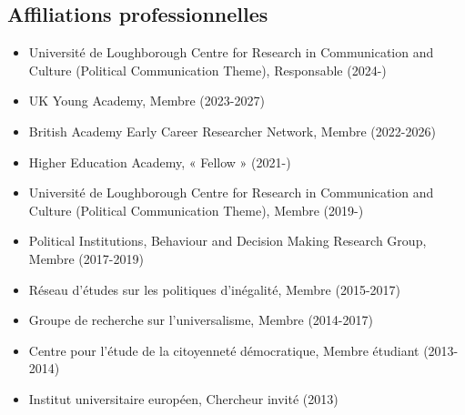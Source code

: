 \documentclass[letterpaper,fontsize=10.5pt]{scrartcl}
\begin{document}
\subsection{Affiliations professionnelles}
\vspace{-.25em}
\begin{itemize}[itemsep=0em, topsep=0em, partopsep=0em]
	\item Université de Loughborough Centre for Research in Communication and Culture (Political Communication Theme), Responsable (2024-)
	\item UK Young Academy, Membre (2023-2027)
	\item British Academy Early Career Researcher Network, Membre (2022-2026)
	\item Higher Education Academy, « Fellow » (2021-)
	\item Université de Loughborough Centre for Research in Communication and Culture (Political Communication Theme), Membre (2019-)
	\item Political Institutions, Behaviour and Decision Making Research Group, Membre (2017-2019)
	\item Réseau d’études sur les politiques d'inégalité, Membre (2015-2017)
	\item Groupe de recherche sur l'universalisme, Membre (2014-2017)
	\item Centre pour l’étude de la citoyenneté démocratique, Membre étudiant (2013-2014)
	\item Institut universitaire européen, Chercheur invité (2013)\\
\end{itemize}
\end{document}
